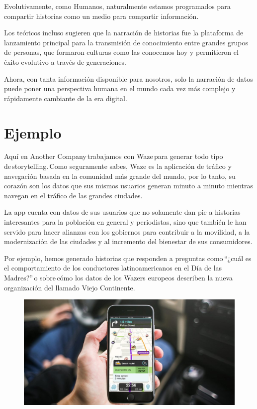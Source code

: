 {{{Evolutivamente, como Humanos, naturalmente estamos programados para compartir historias como un medio para compartir información.

Los teóricos incluso sugieren que la narración de historias fue la plataforma de lanzamiento principal para la transmisión de conocimiento entre grandes grupos de personas, que formaron culturas como las conocemos hoy y permitieron el éxito evolutivo a través de generaciones.

Ahora, con tanta información disponible para nosotros, solo la narración de datos puede poner una perspectiva humana en el mundo cada vez más complejo y rápidamente cambiante de la era digital.}



\section{Ejemplo}

\item{Aquí en Another Company trabajamos con Waze para generar todo tipo de storytelling. Como seguramente sabes, Waze es la aplicación de tráfico y navegación basada en la comunidad más grande del mundo, por lo tanto, su corazón son los datos que sus mismos usuarios generan minuto a minuto mientras navegan en el tráfico de las grandes ciudades. 

La app cuenta con datos de sus usuarios que no solamente dan pie a historias interesantes para la población en general y periodistas, sino que también le han servido para hacer alianzas con los gobiernos para contribuir a la movilidad, a la modernización de las ciudades y al incremento del bienestar de sus consumidores. 

Por ejemplo, hemos generado historias que responden a preguntas como “¿cuál es el comportamiento de los conductores latinoamericanos en el Día de las Madres?” o sobre cómo los datos de los Wazers europeos describen la nueva organización del llamado Viejo Continente. }

\begin{figure}[htb]
\begin{center}
\includegraphics[width=15cm]{./Imagenes/waze2}
\end{center}
\end{figure}


}}
